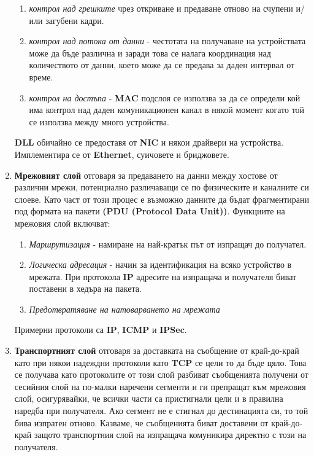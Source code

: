 \documentclass[fleqn,12pt]{article}
\begin{document}
\begin{flushleft}
\begin{enumerate}
\begin{enumerate}
        \item \textit{контрол над грешките} чрез откриване и предаване отново на счупени и/или загубени кадри.
        \item \textit{контрол над потока от данни} - честотата на получаване на устройствата може да бъде различна и заради това се налага координация над количеството от данни, което 
        може да се предава за даден интервал от време.
        \item \textit{контрол на достъпа} - \textbf{MAC} подслоя се използва за да се определи кой има контрол над даден комуникационен канал в някой момент когато той се използва между много устройства.
    \end{enumerate}
    \textbf{DLL} обичайно се предоставя от \textbf{NIC} и някои драйвери на устройства. Имплементира се от \textbf{Ethernet}, суичовете и бриджовете.
    \item \textbf{Мрежовият слой} отговаря за предаването на данни между хостове от различни мрежи, потенциално различаващи се по физическите и каналните си слоеве.
    Като част от този процес е възможно данните да бъдат фрагментирани под формата на пакети \textbf{(PDU (Protocol Data Unit))}.
    Функциите на мрежовия слой включват:
    \begin{enumerate}
        \item \textit{Маршрутизация} - намиране на най-кратък път от изпращач до получател.
        \item \textit{Логическа адресация} - начин за идентификация на всяко устройство в мрежата. При протокола \textbf{IP} адресите на изпращача и получателя биват поставени в хедъра на пакета.
        \item \textit{Предотвратяване на натоварването на мрежата}
    \end{enumerate}
    Примерни протоколи са \textbf{IP}, \textbf{ICMP} и \textbf{IPSec}.
    \item \textbf{Транспортният слой} отговаря за доставката на съобщение от край-до-край като при някои надеждни протоколи като \textbf{TCP} се цели то да бъде цяло.
    Това се получава като протоколите от този слой разбиват съобщенията получени от сесийния слой на по-малки наречени сегменти и ги препращат към мрежовия слой,
    осигурявайки, че всички части са пристигнали цели и в правилна наредба при получателя. Ако сегмент не е стигнал до дестинацията си, то той бива изпратен отново.
    Казваме, че съобщенията биват доставени от край-до-край защото транспортния слой на изпращача комуникира директно с този на получателя.

\end{enumerate}
\end{flushleft}
\end{document}
